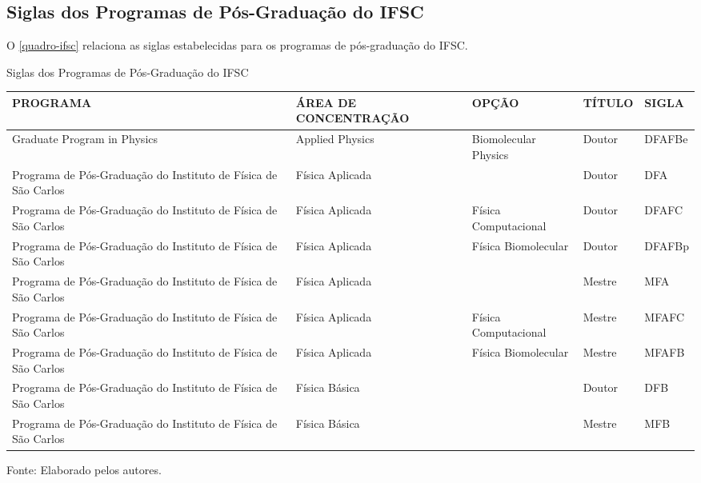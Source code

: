 \begin{apendicesenv}
\chapter{Siglas dos Programas de Pós-Graduação do IFSC}
O \autoref{quadro-ifsc} relaciona as siglas estabelecidas para os programas de pós-graduação do IFSC.
\begin{quadro}[htb]
\ABNTEXfontereduzida
\caption[Siglas dos Programas de Pós-Graduação do IFSC]{Siglas dos Programas de Pós-Graduação do IFSC}
\label{quadro-ifsc}
\begin{tabular}{|p{3.5cm}|p{3.5cm}|p{3.5cm}|p{1.5cm}|p{2.25cm}|}
  \hline
   \textbf{PROGRAMA} & \textbf{ÁREA DE CONCENTRAÇÃO} & \textbf{OPÇÃO} & \textbf{TÍTULO} & \textbf{SIGLA}  \\
    \hline
Graduate Program in Physics & Applied Physics & Biomolecular Physics & Doutor & DFAFBe\\
Programa de Pós-Graduação do Instituto de Física de São Carlos & Física Aplicada &  & Doutor & DFA\\
Programa de Pós-Graduação do Instituto de Física de São Carlos & Física Aplicada & Física Computacional & Doutor & DFAFC\\
Programa de Pós-Graduação do Instituto de Física de São Carlos & Física Aplicada & Física Biomolecular & Doutor & DFAFBp\\
Programa de Pós-Graduação do Instituto de Física de São Carlos & Física Aplicada &  & Mestre & MFA\\
Programa de Pós-Graduação do Instituto de Física de São Carlos & Física Aplicada & Física Computacional & Mestre & MFAFC\\
Programa de Pós-Graduação do Instituto de Física de São Carlos & Física Aplicada & Física Biomolecular & Mestre & MFAFB\\
Programa de Pós-Graduação do Instituto de Física de São Carlos & Física Básica &  & Doutor & DFB\\
Programa de Pós-Graduação do Instituto de Física de São Carlos & Física Básica &  & Mestre & MFB\\
		\hline

\end{tabular}
\begin{flushleft}
		Fonte: Elaborado pelos autores.\
\end{flushleft}
\end{quadro}


\end{apendicesenv}
